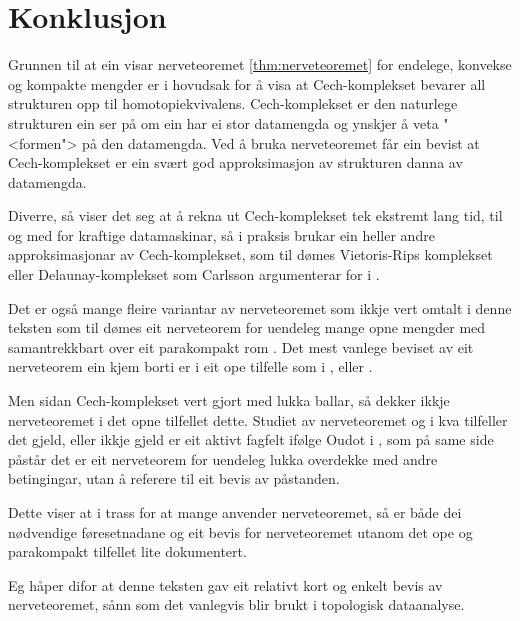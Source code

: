 \documentclass[a4paper, 12pt, norsk]{article}
\theoremstyle{plain}
\theoremstyle{definition}
\begin{document}
\section{Konklusjon}

Grunnen til at ein visar nerveteoremet \autoref{thm:nerveteoremet} for endelege, konvekse og kompakte mengder er i hovudsak for å visa at Cech-komplekset bevarer all strukturen opp til homotopiekvivalens. Cech-komplekset er den naturlege strukturen ein ser på om ein har ei stor datamengda og ynskjer å veta "<formen"> på den datamengda. Ved å bruka nerveteoremet får ein bevist at Cech-komplekset er ein svært god approksimasjon av strukturen danna av datamengda.

Diverre, så viser det seg at å rekna ut Cech-komplekset tek ekstremt lang tid, til og med for kraftige datamaskinar, så i praksis brukar ein heller andre approksimasjonar av Cech-komplekset, som til dømes Vietoris-Rips komplekset eller Delaunay-komplekset som Carlsson argumenterar for i \cite[s. 263--264]{MR2476414}.

Det er også mange fleire variantar av nerveteoremet som ikkje vert omtalt i denne teksten som til dømes eit nerveteorem for uendeleg mange opne mengder med samantrekkbart over eit parakompakt rom \cite[Corollary 4G.3]{MR1867354}. Det mest vanlege beviset av eit nerveteorem ein kjem borti er i eit ope tilfelle som i \cite[Theorem 15.21]{MR2361455}, \cite[Theorem 4.3]{MR4218370} eller \cite[Theorem 2.3]{MR2476414}.

Men sidan Cech-komplekset vert gjort med lukka ballar, så dekker ikkje nerveteoremet i det opne tilfellet dette. Studiet av nerveteoremet og i kva tilfeller det gjeld, eller ikkje gjeld er eit aktivt fagfelt ifølge Oudot i \cite[s. 82]{MR3408277}, som på same side påstår det er eit nerveteorem for uendeleg lukka overdekke med andre betingingar, utan å referere til eit bevis av påstanden.

Dette viser at i trass for at mange anvender nerveteoremet, så er både dei nødvendige føresetnadane og eit bevis for nerveteoremet utanom det ope og parakompakt tilfellet lite dokumentert.

Eg håper difor at denne teksten gav eit relativt kort og enkelt bevis av nerveteoremet, sånn som det vanlegvis blir brukt i topologisk dataanalyse.

{}

\end{document}
